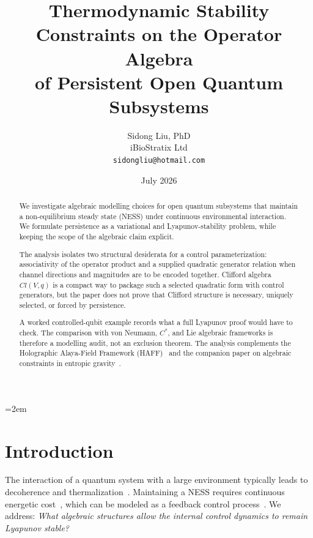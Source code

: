 \documentclass[aps,pre,onecolumn,superscriptaddress,floatfix,longbibliography]{revtex4-2}
\begin{document}
\emergencystretch=2em
\raggedbottom
{}

\title{Thermodynamic Stability Constraints on the Operator Algebra\\
of Persistent Open Quantum Subsystems}

\author{Sidong Liu, PhD \\
\small iBioStratix Ltd \\
\small \texttt{sidongliu@hotmail.com}}

\date{July 2026}

\begin{abstract}
We investigate algebraic modelling choices for open quantum subsystems
that maintain a non-equilibrium steady state (NESS) under continuous
environmental interaction.  We formulate persistence as a variational
and Lyapunov-stability problem, while keeping the scope of the algebraic
claim explicit.

The analysis isolates two structural desiderata for a control
parameterization: associativity of the operator product and a supplied
quadratic generator relation when channel directions and magnitudes are
to be encoded together.  Clifford algebra $Cl(V,q)$ is a compact way to
package such a selected quadratic form with control generators, but the
paper does not prove that Clifford structure is necessary, uniquely
selected, or forced by persistence.

A worked controlled-qubit example records what a full Lyapunov proof
would have to check.  The comparison with von Neumann, $C^*$, and Lie
algebraic frameworks is therefore a modelling audit, not an exclusion
theorem.
The analysis complements the Holographic Alaya-Field Framework (HAFF)~\cite{Liu2026PaperA,Liu2026PaperB} and the companion paper on algebraic constraints in entropic gravity~\cite{Liu2026QRAIF_A}.
\end{abstract}

\maketitle

\section{Introduction}
\label{sec:intro}

The interaction of a quantum system with a large environment typically leads to decoherence and thermalization~\cite{Breuer2002,Weiss2012}.
Maintaining a NESS requires continuous energetic cost~\cite{Seifert2012,Jarzynski2011}, which can be modeled as a feedback control process~\cite{Sagawa2012,Parrondo2015}.
We address: \textit{What algebraic structures allow the internal control dynamics to remain Lyapunov stable?}
\end{document}
